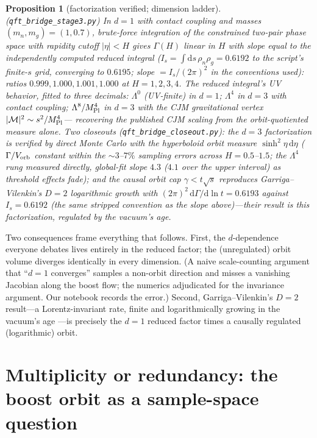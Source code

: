 \documentclass[11pt]{article}
\newtheorem{proposition}[theorem]{Proposition}
\theoremstyle{definition}
\theoremstyle{remark}
\newcommand{\dd}{\mathrm{d}}
\begin{document}
\begin{proposition}[factorization verified; dimension ladder]
\label{prop:ladder}
(\texttt{qft\_bridge\_stage3.py})
In $d=1$ with contact coupling and masses $(m_n,m_g)=(1,0.7)$,
brute-force integration of the constrained two-pair phase space with
rapidity cutoff $|\eta|<H$ gives $\Gamma(H)$ linear in $H$ with slope
equal to the independently computed reduced integral
($I_s=\int\dd s\,\rho_n\rho_g=0.6192$ to the script's finite-$s$ grid, converging to $0.6195$; slope $=I_s/(2\pi)^2$ in
the conventions used): ratios $0.999,1.000,1.001,1.000$ at
$H=1,2,3,4$.
The reduced integral's UV behavior, fitted to three decimals:
$\Lambda^{0}$ (UV-finite) in $d=1$; $\Lambda^{4}$ in $d=3$ with
contact coupling; $\Lambda^{8}/M_{\rm Pl}^{4}$ in $d=3$ with the CJM
gravitational vertex $|\mathcal M|^{2}\sim s^{2}/M_{\rm Pl}^{4}$---%
recovering the published CJM scaling from the orbit-quotiented
measure alone. Two closeouts
(\texttt{qft\_bridge\_closeout.py}): the $d=3$ factorization is
verified by direct Monte Carlo with the hyperboloid orbit measure
$\sinh^{2}\!\eta\,\dd\eta$ ($\Gamma/V_{\rm orb}$ constant within the
${\sim}3$--$7\%$ sampling errors across $H=0.5$--$1.5$; the $\Lambda^{4}$
rung measured directly, global-fit slope $4.3$ ($4.1$ over the upper interval) as threshold effects
fade); and the causal orbit cap $\gamma<t\sqrt s$ reproduces
Garriga--Vilenkin's $D=2$ logarithmic growth with
$(2\pi)^2\,\dd\Gamma/\dd\ln t=0.6193$ against $I_s=0.6192$ (the same
stripped convention as the slope above)---their result is
this factorization, regulated by the vacuum's age.
\end{proposition}

Two consequences frame everything that follows. First, the
$d$-dependence everyone debates lives entirely in the reduced factor;
the (unregulated) orbit volume diverges identically in every dimension. (A naive
scale-counting argument that ``$d=1$ converges'' samples a non-orbit
direction and misses a vanishing Jacobian along the boost flow; the
numerics adjudicated for the invariance argument. Our notebook
records the error.) Second, Garriga--Vilenkin's $D=2$ result---a
Lorentz-invariant rate, finite and logarithmically growing in the
vacuum's age \cite{GV2013}---is precisely the $d=1$ reduced
factor times a causally regulated (logarithmic) orbit.

\section{Multiplicity or redundancy: the boost orbit as a
sample-space question}
\label{sec:multiplicity}
\end{document}

